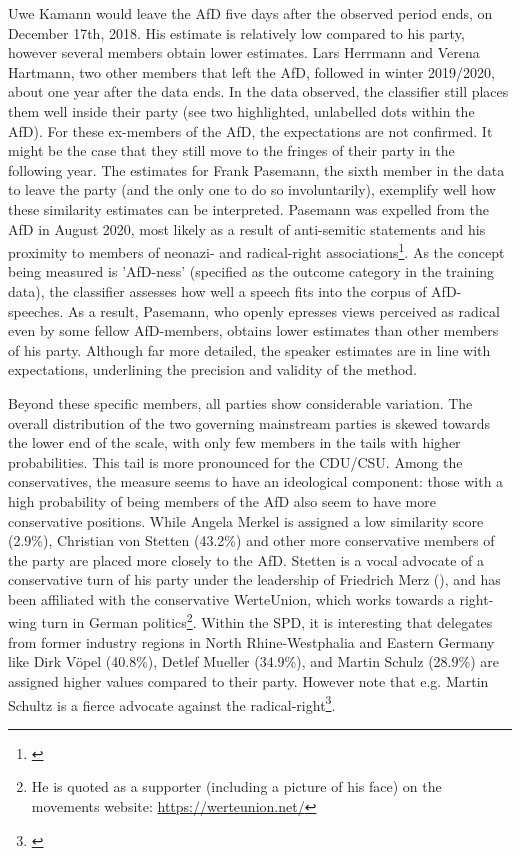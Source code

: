 \documentclass{article}
\begin{document}
Uwe Kamann would leave the AfD five days after the observed period ends, on December 17th, 2018. His estimate is relatively low compared to his party, however several members obtain lower estimates. Lars Herrmann and Verena Hartmann, two other members that left the AfD, followed in winter 2019/2020, about one year after the data ends. In the data observed, the classifier still places them well inside their party (see two highlighted, unlabelled dots within the AfD). For these ex-members of the AfD, the expectations are not confirmed. It might be the case that they still move to the fringes of their party in the following year. The estimates for Frank Pasemann, the sixth member in the data to leave the party (and the only one to do so involuntarily), exemplify well how these similarity estimates can be interpreted. Pasemann was expelled from the AfD in August 2020, most likely as a result of anti-semitic statements and his proximity to members of neonazi- and radical-right associations\footnote{\cite{MDR2018Pasemann, MDR2020Pasemann}}. As the concept being measured is 'AfD-ness' (specified as the outcome category in the training data), the classifier assesses how well a speech fits into the corpus of AfD-speeches. As a result, Pasemann, who openly epresses views perceived as radical even by some fellow AfD-members, obtains lower estimates than other members of his party. Although far more detailed, the speaker estimates are in line with expectations, underlining the precision and validity of the method. \par

Beyond these specific members, all parties show considerable variation. The overall distribution of the two governing mainstream parties is skewed towards the lower end of the scale, with only few members in the tails with higher probabilities. This tail is more pronounced for the CDU/CSU. Among the conservatives, the measure seems to have an ideological component: those with a high probability of being members of the AfD also seem to have more conservative positions. While Angela Merkel is assigned a low similarity score (2.9\%), Christian von Stetten (43.2\%) and other more conservative members of the party are placed more closely to the AfD. Stetten is a vocal advocate of a conservative turn of his party under the leadership of Friedrich Merz (\cite{Weinzierler2019}), and has been affiliated with the conservative WerteUnion, which works towards a right-wing turn in German politics\footnote{He is quoted as a supporter (including a picture of his face) on the movements website: \url{https://werteunion.net/}}. Within the SPD, it is interesting that delegates from former industry regions in North Rhine-Westphalia and Eastern Germany like Dirk Vöpel (40.8\%), Detlef Mueller (34.9\%), and Martin Schulz (28.9\%) are assigned higher values compared to their party. However note that e.g. Martin Schultz is a fierce advocate against the radical-right\footnote{\cite{Tagesspiegel2018Schulz}}.\par
\end{document}
